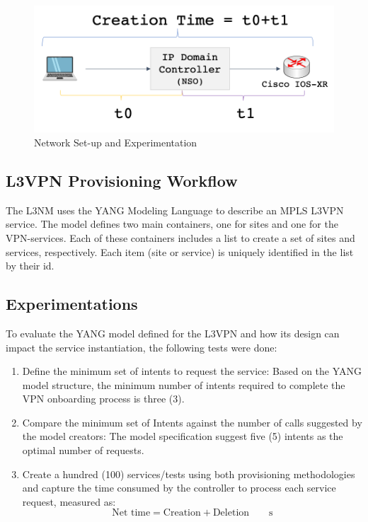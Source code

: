 \documentclass[conference]{IEEEtran}
\begin{document}
\begin{figure}
	\centering
		\includegraphics[width=\linewidth]{figure71.png}
	\caption{Network Set-up and Experimentation}
	\label{FIG:7}
\end{figure}

\subsection{L3VPN Provisioning Workflow}

The L3NM uses the YANG Modeling Language to describe an MPLS L3VPN service. The model defines two main containers, one for sites and one for the VPN-services. Each of these containers includes a list to create a set of sites and services, respectively. Each item (site or service) is uniquely identified in the list by their id.


\subsection{Experimentations}
To evaluate the YANG model defined for the L3VPN and how its design can impact the service instantiation, the following tests were done:
\begin{enumerate}
    \item Define the minimum set of intents to request the service: Based on the YANG model structure, the minimum number of intents required to complete the VPN onboarding process is three (3).
    \item Compare the minimum set of Intents against the number of calls suggested by the model creators: The model specification suggest five (5) intents as the optimal number of requests. 
    \item Create a hundred (100) services/tests using both provisioning methodologies and capture the time consumed by the controller to process each service request, measured as:
    \begin{equation}
         \si{\textrm{Net time}= \textrm{Creation} + \textrm{Deletion}\qquad \second}
    \end{equation}
\end{enumerate}
\end{document}
